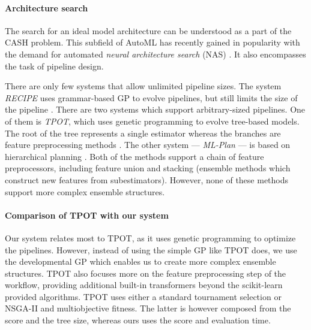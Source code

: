 \paragraph{Architecture search}
The search for an ideal model architecture can be understood as a part of the
CASH problem. This subfield of AutoML has recently gained in popularity with the
demand for automated \emph{neural architecture search} (NAS)
\citep{2018arXiv180805377E}. It also encompasses the task of pipeline design.

There are only few systems that allow unlimited pipeline sizes. The system
\emph{RECIPE} uses grammar-based GP to evolve pipelines, but still limits the
size of the pipeline \citep{10.1007/978-3-319-55696-3_16}.
There are two systems which support arbitrary-sized pipelines. One of them is
\emph{TPOT}, which uses genetic programming to evolve tree-based models. The
root of the tree represents a single estimator whereas the branches are feature
preprocessing methods \citep{Olson2016EvoBio}.
The other system --- \emph{ML-Plan} --- is based on hierarchical planning
\citep{Mohr2018}. Both of the methods support a chain of feature preprocessors,
including feature union and stacking (ensemble methods which construct new
features from subestimators). However, none of these methods support more
complex ensemble structures.
\paragraph{Comparison of TPOT with our system}
Our system relates most to TPOT, as it uses genetic programming to optimize
the pipelines. However, instead of using the simple GP like TPOT does, we use
the developmental GP which enables us to create more complex ensemble
structures. TPOT also focuses more on the feature preprocessing step of the 
workflow, providing additional built-in transformers beyond the scikit-learn 
provided algorithms. TPOT uses either a standard tournament selection or 
NSGA-II and multiobjective fitness. The latter is however composed from the 
score and the tree size, whereas ours uses the score and evaluation time.